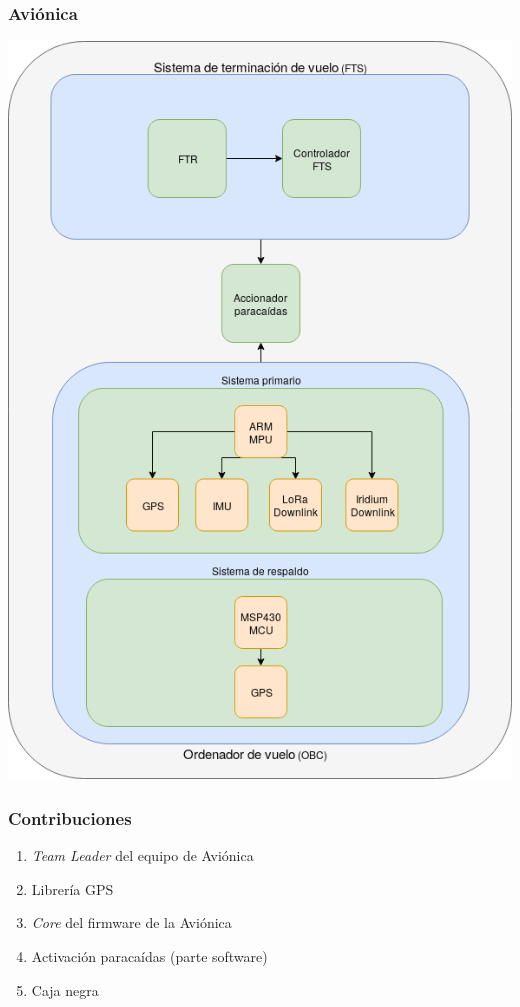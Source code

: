 \documentclass[numfooter]{beamer}
\begin{document}
    \begin{frame}
        \frametitle{Aviónica}
        \includegraphics[height=0.8\textheight]{images/avionics.png}
    \end{frame}

    \begin{frame}
        \frametitle{Contribuciones}
        \begin{enumerate}
            \item \textit{Team Leader} del equipo de Aviónica
            \item Librería GPS
            \item \textit{Core} del firmware de la Aviónica
            \item Activación paracaídas (parte software)
            \item Caja negra
        \end{enumerate}
    \end{frame}
  
\end{document}
